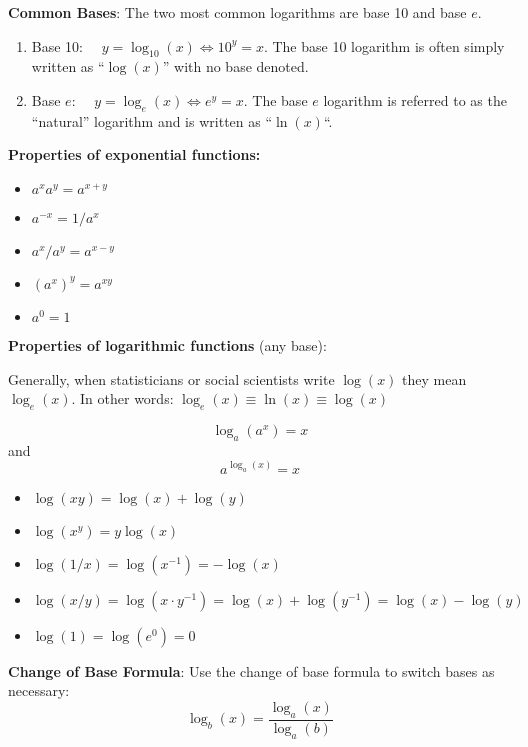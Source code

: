\documentclass[]{book}
\providecommand{\tightlist}{%
  \setlength{\itemsep}{0pt}\setlength{\parskip}{0pt}}
\theoremstyle{definition}
\theoremstyle{definition}
\theoremstyle{definition}
\theoremstyle{remark}
\begin{document}
\textbf{Common Bases}: The two most common logarithms are base 10 and
base \(e\).

\begin{enumerate}
\def\labelenumi{\arabic{enumi}.}
\tightlist
\item
  Base 10: \(\quad y=\log_{10}(x) \iff 10^y=x\). The base 10 logarithm
  is often simply written as ``\(\log(x)\)'' with no base denoted.
\item
  Base \(e\): \(\quad y=\log_e(x) \iff e^y=x\). The base \(e\) logarithm
  is referred to as the ``natural'' logarithm and is written as
  ``\(\ln(x)\)``.
\end{enumerate}

\begin{comment}
            {\texttt{[image: ln.eps]}} \,  {\texttt{[image: exp.eps]}}
            \end{comment}

\textbf{Properties of exponential functions:}

\begin{itemize}
\tightlist
\item
  \(a^x a^y = a^{x+y}\)
\item
  \(a^{-x} = 1/a^x\)
\item
  \(a^x/a^y = a^{x-y}\)
\item
  \((a^x)^y = a^{x y}\)
\item
  \(a^0 = 1\)
\end{itemize}

\textbf{Properties of logarithmic functions} (any base):

Generally, when statisticians or social scientists write \(\log(x)\)
they mean \(\log_e(x)\). In other words:
\(\log_e(x) \equiv \ln(x) \equiv \log(x)\)

\[\log_a(a^x)=x\] and \[a^{\log_a(x)}=x\]

\begin{itemize}
\tightlist
\item
  \(\log(x y)=\log(x)+\log(y)\)
\item
  \(\log(x^y)=y\log(x)\)
\item
  \(\log(1/x)=\log(x^{-1})=-\log(x)\)
\item
  \(\log(x/y)=\log(x\cdot y^{-1})=\log(x)+\log(y^{-1})=\log(x)-\log(y)\)
\item
  \(\log(1)=\log(e^0)=0\)
\end{itemize}

\textbf{Change of Base Formula}: Use the change of base formula to
switch bases as necessary: \[\log_b(x) = \frac{\log_a(x)}{\log_a(b)}\]
\end{document}

